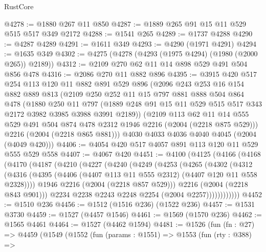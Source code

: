 \begin{lexlean}{RustCore}
\begin{coremodule}
@4278 := @1880 @267 @11 @850
@4287 := @1889 @265 @91 @15 @11 @529 @515 @517 @349 @2172
@4288 := @1541 @265
@4289 := @1737 @4288
@4290 := @4287 @4289
@4291 := @1611 @349
@4293 := @4290 (@1971 @4291)
@4294 := @1635 @349
@4302 := @4275 (@4278 (@4293 (@1975 @4294) (@1980 (@2000 @265)) @2189))
@4312 := @2109 @270 @62 @11 @14 @898 @529 @491 @504 @856 @478
@4316 := @2086 @270 @11 @882 @896
@4395 := @3915
    @420
    @517
    @254
    @113
    @120
    @11
    @882
    @891
    @529
    @896
    (@2096
      @243
      @253
      @16
      @154
      @882
      @889
      @813
      (@2109
        @250
        @252
        @11
        @15
        @797
        @881
        @888
        @504
        @864
        @478
        (@1880
          @250
          @11
          @797
          (@1889 @248 @91 @15 @11 @529 @515 @517 @343 @2172 @3982 @3985 @3988 @3991 @2189))
        (@2109
          @113
          @62
          @11
          @14
          @555
          @529
          @491
          @504
          @874
          @478
          @2312
          @1946
          @2216
          (@2004 (@2218 @875 @529)))
        @2216
        (@2004 (@2218 @865 @881)))
      @4030
      @4033
      @4036
      @4040
      @4045
      (@2004 (@4049 @420)))
@4406 := @4054 @420 @517 @4057 @891 @113 @120 @11 @529 @555 @529 @558
@4407 := @4067 @420
@4451 := @4100
    (@4125
      (@4166
        (@4168
          (@4170
            (@4187
              (@4210
                (@4227
                  (@4240
                    (@4249
                      (@4253
                        (@4265
                          (@4302
                            (@4312
                              (@4316
                                (@4395
                                  (@4406 (@4407 @113 @11 @555 @2312) (@4407 @120 @11 @558 @2328))))
                              @1946
                              @2216
                              (@2004 (@2218 @857 @529)))
                            @2216
                            (@2004 (@2218 @843 @901)))
                          @2234
                          @2238
                          @2243
                          @2248
                          @2254
                          (@2004 @2257))))))))))))
@4452 := @1510 @236
@4456 := @1512 (@1516 @236) (@1522 @236)
@4457 := @1531 @3730
@4459 := @1527 (@4457 @1546)
@4461 := @1569 (@1570 @236)
@4462 := @1565 @4461
@4464 := @1527 (@4462 @1594)
@4481 := @1526
    (fun (fn : @27) =>
    @4459
      (@1549
        (@1552
          (fun (params : @1551) =>
          @1553
            (fun (rty : @388) =>

\end{coremodule}
\end{lexlean}
